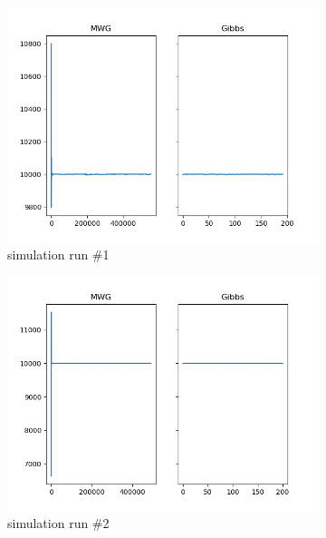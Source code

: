 \begin{figure}[H]
    \centering
    \begin{subfigure}{.3\textwidth}
    	\centering
        \includegraphics[width=\linewidth]{../../plots/Trace_M2_N20000_NMCMC3_seed0_diffind2.png}
        \caption{simulation run \#1}
    \end{subfigure}
    \begin{subfigure}{.3\textwidth}
        \centering
    	\includegraphics[width=\linewidth]{../../plots/Trace_M2_N20000_NMCMC3_seed1_diffind2.png}
    	\caption{simulation run \#2}
	\end{subfigure}
	\begin{subfigure}{.3\textwidth}
	    \centering

\end{subfigure}
\end{figure}
